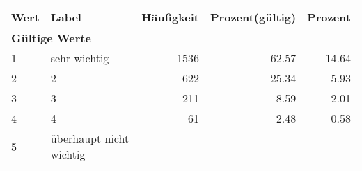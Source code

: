      \begin{longtable}{lXrrr}
     \toprule
     \textbf{Wert} & \textbf{Label} & \textbf{Häufigkeit} & \textbf{Prozent(gültig)} & \textbf{Prozent} \\
     \endhead
     \midrule
     \multicolumn{5}{l}{\textbf{Gültige Werte}}\\

     1 &
     \multicolumn{1}{X}{ sehr wichtig   } &


       \num{1536} &
       \num[round-mode=places,round-precision=2]{62,57} &
         \num[round-mode=places,round-precision=2]{14,64} \\

     2 &
     \multicolumn{1}{X}{ 2   } &


       \num{622} &
       \num[round-mode=places,round-precision=2]{25,34} &
         \num[round-mode=places,round-precision=2]{5,93} \\

     3 &
     \multicolumn{1}{X}{ 3   } &


       \num{211} &
       \num[round-mode=places,round-precision=2]{8,59} &
         \num[round-mode=places,round-precision=2]{2,01} \\

     4 &
     \multicolumn{1}{X}{ 4   } &


       \num{61} &
       \num[round-mode=places,round-precision=2]{2,48} &
         \num[round-mode=places,round-precision=2]{0,58} \\

     5 &
     \multicolumn{1}{X}{ überhaupt nicht wichtig   } &



\end{longtable}
